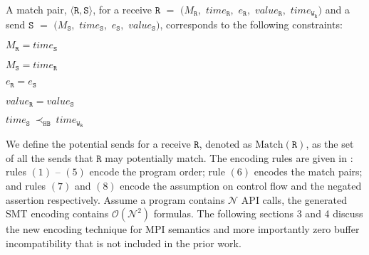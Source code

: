 \begin{definition} \label{def:match}
A match pair, $\langle\mathtt{R}, \mathtt{S}\rangle$, for a receive 
$\mathtt{R}$ $=$ $(M_\mathtt{R},$ $\mathit{time}_\mathtt{R},$ $e_\mathtt{R},$ $\mathit{value}_\mathtt{R},$ $\mathit{time}_{\mathtt{W}_\mathtt{R}})$ and a send $\mathtt{S}$ $=$ $(M_\mathtt{S},$ $\mathit{time}_\mathtt{S},$ $e_\mathtt{S},$ $\mathit{value}_\mathtt{S})$, corresponds to the following constraints:
\begin{compactenum}
\item $M_{\mathtt{R}} = \mathit{time}_{\mathtt{S}}$
\item $M_{\mathtt{S}} = \mathit{time}_{\mathtt{R}}$
\item $e_{\mathtt{R}} = e_{\mathtt{S}}$
\item $\mathit{value}_{\mathtt{R}} = \mathit{value}_{\mathtt{S}}$ 
\item $\mathit{time}_{\mathtt{S}}\ \mathrm{\prec_\mathtt{HB}}\ \mathit{time}_{\mathtt{W}_\mathtt{R}}$
\end{compactenum}
\end{definition}

We define the potential sends for a receive $\mathtt{R}$, denoted as $\mathrm{Match}(\mathtt{R})$, as the set of all the sends that $\mathtt{R}$ may potentially match. The encoding rules are given in : rules $(1)$ -- $(5)$ encode the program order; rule $(6)$ encodes the match pairs; and rules $(7)$ and $(8)$ encode the assumption on control flow and the negated assertion respectively. Assume a program contains $\mathcal{N}$ API calls, the generated SMT encoding contains $\mathcal{O}(\mathcal{N}^2)$ formulas. The following sections 3 and 4 discuss the new encoding technique for MPI semantics and more importantly zero buffer incompatibility that is not included in the prior work.  

\encodingptp